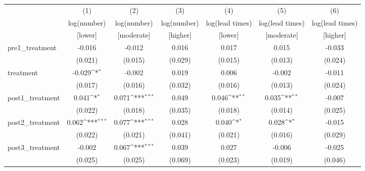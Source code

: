 {
\def\sym#1{\ifmmode^{#1}\else\(^{#1}\)\fi}
\begin{adjustbox}{max width=\textwidth}
\begin{tabular}{l*{6}{c}}
\toprule
            &\multicolumn{1}{c}{(1)}&\multicolumn{1}{c}{(2)}&\multicolumn{1}{c}{(3)}&\multicolumn{1}{c}{(4)}&\multicolumn{1}{c}{(5)}&\multicolumn{1}{c}{(6)}\\
            &\multicolumn{1}{c}{log(number)}&\multicolumn{1}{c}{log(number)}&\multicolumn{1}{c}{log(number)}&\multicolumn{1}{c}{log(lead times)}&\multicolumn{1}{c}{log(lead times)}&\multicolumn{1}{c}{log(lead times)}\\
            &[lower]&[moderate]&[higher]&[lower]&[moderate]&[higher]\\
\midrule
pre1\_treatment&      -0.016         &      -0.012         &       0.016         &       0.017         &       0.015         &      -0.033         \\
            &     (0.021)         &     (0.015)         &     (0.029)         &     (0.015)         &     (0.013)         &     (0.024)         \\
\addlinespace
treatment   &      -0.029\sym{*}  &      -0.002         &       0.019         &       0.006         &      -0.002         &      -0.011         \\
            &     (0.017)         &     (0.016)         &     (0.032)         &     (0.016)         &     (0.013)         &     (0.024)         \\
\addlinespace
post1\_treatment&       0.041\sym{*}  &       0.071\sym{***}&       0.049         &       0.046\sym{**} &       0.035\sym{**} &      -0.007         \\
            &     (0.022)         &     (0.018)         &     (0.035)         &     (0.018)         &     (0.014)         &     (0.025)         \\
\addlinespace
post2\_treatment&       0.062\sym{***}&       0.077\sym{***}&       0.028         &       0.040\sym{*}  &       0.028\sym{*}  &      -0.015         \\
            &     (0.022)         &     (0.021)         &     (0.041)         &     (0.021)         &     (0.016)         &     (0.029)         \\
\addlinespace
post3\_treatment&      -0.002         &       0.067\sym{***}&       0.039         &       0.027         &      -0.006         &      -0.025         \\
            &     (0.025)         &     (0.025)         &     (0.069)         &     (0.023)         &     (0.019)         &     (0.046)         \\

\end{tabular}
\end{adjustbox}}
